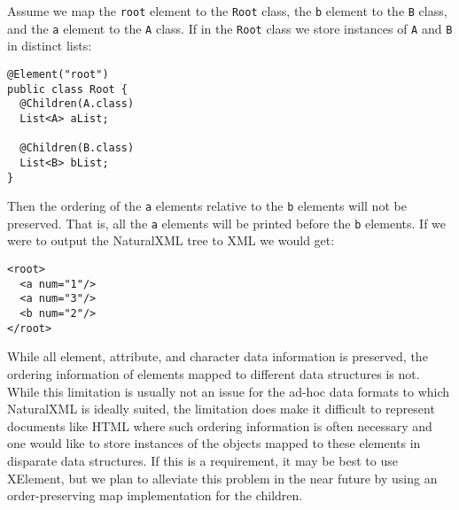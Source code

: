 Assume we map the \lstinline{root} element to the \lstinline{Root}
class, the \lstinline{b} element to the \lstinline{B} class, and the
\lstinline{a} element to the \lstinline{A} class.  If in the
\lstinline{Root} class we store instances of \lstinline{A} and
\lstinline{B} in distinct lists:

\begin{lstlisting}
@Element("root")
public class Root {
  @Children(A.class)
  List<A> aList;

  @Children(B.class)
  List<B> bList;
}
\end{lstlisting}
Then the ordering of the \lstinline{a} elements relative to the
\lstinline{b} elements will not be preserved. That is, all the
\lstinline{a} elements will be printed before the \lstinline{b}
elements. If we were to output the NaturalXML tree to XML we would get:
\begin{lstlisting} 
<root>
  <a num="1"/>
  <a num="3"/>
  <b num="2"/>
</root>
\end{lstlisting}

While all element, attribute, and character data information is preserved, the
ordering information of elements mapped to different data structures
is not.  While this limitation is usually not an issue for the ad-hoc
data formats to which NaturalXML is ideally suited, %
the limitation does make it difficult to represent documents like HTML
where such ordering information is often necessary and one would like
to store instances of the objects mapped to these elements in
disparate data structures.  If this is a requirement, it may be best
to use XElement, but we plan to alleviate this problem in the near
future by using an order-preserving map implementation for the
children.

